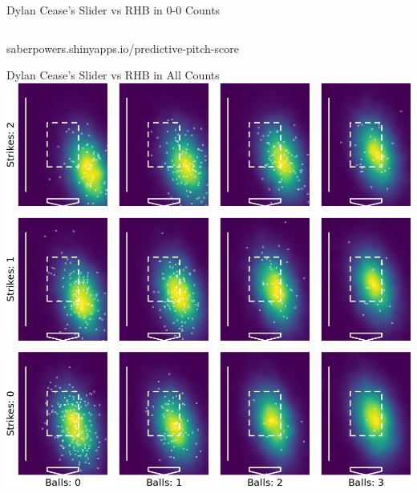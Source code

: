 \documentclass{beamer}
\begin{document}
\begin{frame}{Dylan Cease's Slider vs RHB in 0-0 Counts}
\begin{columns}
\begin{column}{0.5\textwidth}
      \end{column}
    \end{columns}
    \vfill
    \centering \scriptsize {\color{ricerichblue}saberpowers}{\color{ricegray}.shinyapps.io/}{\color{ricerichblue}predictive-pitch-score}\\
  \end{frame}

  \begin{frame}{Dylan Cease's Slider vs RHB in All Counts}
    \vfill
    \centering
    \includegraphics[height = 0.85\textheight]{images/656302_SL_R_plate.png}
  \end{frame}

%
%
\end{document}
